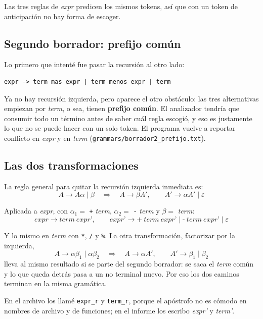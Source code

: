 \documentclass[12pt,letterpaper]{article}
\newcommand{\tk}[1]{\texttt{#1}}
\newcommand{\nt}[1]{\textit{#1}}
\begin{document}
Las tres reglas de \nt{expr} predicen los mismos tokens, así que con un token de anticipación no hay forma de escoger.

\subsection{Segundo borrador: prefijo común}

Lo primero que intenté fue pasar la recursión al otro lado:

\begin{lstlisting}
expr -> term mas expr | term menos expr | term
\end{lstlisting}

Ya no hay recursión izquierda, pero aparece el otro obstáculo: las tres alternativas empiezan por \nt{term}, o sea, tienen \textbf{prefijo común}. El analizador tendría que consumir todo un término antes de saber cuál regla escogió, y eso es justamente lo que no se puede hacer con un solo token. El programa vuelve a reportar conflicto en \nt{expr} y en \nt{term} (\tk{grammars/borrador2\_prefijo.txt}).

\subsection{Las dos transformaciones}

La regla general para quitar la recursión izquierda inmediata es:
\[
A \rightarrow A\alpha \mid \beta \quad \Longrightarrow \quad A \rightarrow \beta A', \qquad A' \rightarrow \alpha A' \mid \varepsilon
\]

Aplicada a \nt{expr}, con $\alpha_1 =$ \tk{+} \nt{term}, $\alpha_2 =$ \tk{-} \nt{term} y $\beta =$ \nt{term}:
\[
\nt{expr} \rightarrow \nt{term}\ \nt{expr'}, \qquad
\nt{expr'} \rightarrow \tk{+}\ \nt{term}\ \nt{expr'} \mid \tk{-}\ \nt{term}\ \nt{expr'} \mid \varepsilon
\]

Y lo mismo en \nt{term} con \tk{*}, \tk{/} y \tk{\%}. La otra transformación, factorizar por la izquierda,
\[
A \rightarrow \alpha\beta_1 \mid \alpha\beta_2 \quad \Longrightarrow \quad A \rightarrow \alpha A', \qquad A' \rightarrow \beta_1 \mid \beta_2
\]
lleva al mismo resultado si se parte del segundo borrador: se saca el \nt{term} común y lo que queda detrás pasa a un no terminal nuevo. Por eso los dos caminos terminan en la misma gramática.

En el archivo los llamé \tk{expr\_r} y \tk{term\_r}, porque el apóstrofo no es cómodo en nombres de archivo y de funciones; en el informe los escribo \nt{expr'} y \nt{term'}.
\end{document}
